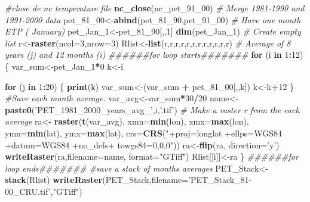 \documentclass[
  10pt,
  b5paper,
]{book}
\newenvironment{Shaded}{\begin{snugshade}}{\end{snugshade}}
\newcommand{\CommentTok}[1]{\textcolor[rgb]{0.56,0.35,0.01}{\textit{#1}}}
\newcommand{\ControlFlowTok}[1]{\textcolor[rgb]{0.13,0.29,0.53}{\textbf{#1}}}
\newcommand{\DataTypeTok}[1]{\textcolor[rgb]{0.13,0.29,0.53}{#1}}
\newcommand{\DecValTok}[1]{\textcolor[rgb]{0.00,0.00,0.81}{#1}}
\newcommand{\KeywordTok}[1]{\textcolor[rgb]{0.13,0.29,0.53}{\textbf{#1}}}
\newcommand{\NormalTok}[1]{#1}
\newcommand{\OperatorTok}[1]{\textcolor[rgb]{0.81,0.36,0.00}{\textbf{#1}}}
\newcommand{\StringTok}[1]{\textcolor[rgb]{0.31,0.60,0.02}{#1}}
\begin{document}
\begin{Shaded}
\begin{Highlighting}[]
 \CommentTok{#close de nc temperature file}
 \KeywordTok{nc_close}\NormalTok{(nc_pet_}\DecValTok{91}\NormalTok{_}\DecValTok{00}\NormalTok{) }
 \CommentTok{# Merge 1981-1990 and 1991-2000 data }
\NormalTok{ pet_}\DecValTok{81}\NormalTok{_}\DecValTok{00}\NormalTok{<-}\KeywordTok{abind}\NormalTok{(pet_}\DecValTok{81}\NormalTok{_}\DecValTok{90}\NormalTok{,pet_}\DecValTok{91}\NormalTok{_}\DecValTok{00}\NormalTok{)}
\CommentTok{# Have one month ETP ( January)}
\NormalTok{ pet_Jan_}\DecValTok{1}\NormalTok{<-pet_}\DecValTok{81}\NormalTok{_}\DecValTok{90}\NormalTok{[,,}\DecValTok{1}\NormalTok{]}
 \KeywordTok{dim}\NormalTok{(pet_Jan_}\DecValTok{1}\NormalTok{) }
 \CommentTok{# Create empty list}
\NormalTok{r<-}\KeywordTok{raster}\NormalTok{(}\DataTypeTok{ncol=}\DecValTok{3}\NormalTok{,}\DataTypeTok{nrow=}\DecValTok{3}\NormalTok{)}
\NormalTok{Rlist<-}\KeywordTok{list}\NormalTok{(r,r,r,r,r,r,r,r,r,r,r,r)}
 \CommentTok{# Average of 8 years (j)  and 12 months (i) }
\CommentTok{######for loop starts#######}
 \ControlFlowTok{for}\NormalTok{ (i }\ControlFlowTok{in} \DecValTok{1}\OperatorTok{:}\DecValTok{12}\NormalTok{) \{ }
\NormalTok{var_sum<-pet_Jan_}\DecValTok{1}\OperatorTok{*}\DecValTok{0}
\NormalTok{k<-i}
 
\ControlFlowTok{for}\NormalTok{ (j }\ControlFlowTok{in} \DecValTok{1}\OperatorTok{:}\DecValTok{20}\NormalTok{) \{}
\KeywordTok{print}\NormalTok{(k)}
\NormalTok{var_sum<-(var_sum }\OperatorTok{+}\StringTok{ }\NormalTok{pet_}\DecValTok{81}\NormalTok{_}\DecValTok{00}\NormalTok{[,,k])}
\NormalTok{ k<-k}\OperatorTok{+}\DecValTok{12}
\NormalTok{ \}}
\CommentTok{#Save each month average. }
\NormalTok{ var_avg<-var_sum}\OperatorTok{*}\DecValTok{30}\OperatorTok{/}\DecValTok{20}
\NormalTok{name<-}\KeywordTok{paste0}\NormalTok{(}\StringTok{'PET_1981_2000_years_avg_'}\NormalTok{,i,}\StringTok{'.tif'}\NormalTok{)}
 \CommentTok{# Make a raster r from the each average}
\NormalTok{ra<-}\StringTok{ }\KeywordTok{raster}\NormalTok{(}\KeywordTok{t}\NormalTok{(var_avg), }\DataTypeTok{xmn=}\KeywordTok{min}\NormalTok{(lon), }\DataTypeTok{xmx=}\KeywordTok{max}\NormalTok{(lon), }\DataTypeTok{ymn=}\KeywordTok{min}\NormalTok{(lat), }\DataTypeTok{ymx=}\KeywordTok{max}\NormalTok{(lat), }\DataTypeTok{crs=}\KeywordTok{CRS}\NormalTok{(}\StringTok{"+proj=longlat +ellps=WGS84 +datum=WGS84 +no_defs+ towgs84=0,0,0"}\NormalTok{))}
\NormalTok{ra<-}\KeywordTok{flip}\NormalTok{(ra, }\DataTypeTok{direction=}\StringTok{'y'}\NormalTok{)}
\KeywordTok{writeRaster}\NormalTok{(ra,}\DataTypeTok{filename=}\NormalTok{name, }\DataTypeTok{format=}\StringTok{"GTiff"}\NormalTok{)}
\NormalTok{Rlist[[i]]<-ra}
\NormalTok{\}}
\CommentTok{######for loop ends#######}
 \CommentTok{#save a stack of months averages}
\NormalTok{ PET_Stack<-}\KeywordTok{stack}\NormalTok{(Rlist)}
\KeywordTok{writeRaster}\NormalTok{(PET_Stack,}\DataTypeTok{filename=}\StringTok{'PET_Stack_81-00_CRU.tif'}\NormalTok{,}\StringTok{"GTiff"}\NormalTok{) }
\end{Highlighting}
\end{Shaded}
\end{document}
